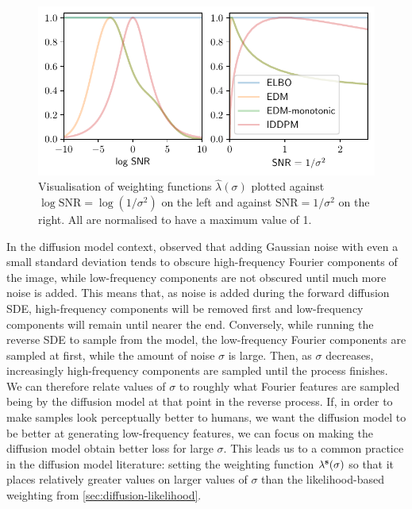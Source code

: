 \begin{figure}
    \centering
    \includegraphics[width=\textwidth]{figs/thesis/diffusion_weighting.pdf}
    \caption{Visualisation of weighting functions $\hat{\lambda}(\sigma)$ plotted against $\log \text{SNR} = \log(1/\sigma^2)$ on the left and against $\text{SNR} = 1/\sigma^2$ on the right. All are normalised to have a maximum value of 1.}
    \label{fig:diffusion-weighting}
\end{figure}

In the diffusion model context, \citet{yang2023diffusion} observed that adding Gaussian noise with even a small standard deviation tends to obscure high-frequency Fourier components of the image, while low-frequency components are not obscured until much more noise is added. This means that, as noise is added during the forward diffusion SDE, high-frequency components will be removed first and low-frequency components will remain until nearer the end. Conversely, while running the reverse SDE to sample from the model, the low-frequency Fourier components are sampled at first, while the amount of noise $\sigma$ is large. Then, as $\sigma$ decreases, increasingly high-frequency components are sampled until the process finishes. We can therefore relate values of $\sigma$ to roughly what Fourier features are sampled being by the diffusion model at that point in the reverse process. If, in order to make samples look perceptually better to humans, we want the diffusion model to be better at generating low-frequency features, we can focus on making the diffusion model obtain better loss for large $\sigma$. This leads us to a common practice in the diffusion model literature: setting the weighting function $\lambda^{\mathbf{s}}(\sigma)$ so that it places relatively greater values on larger values of $\sigma$ than the likelihood-based weighting from \cref{sec:diffusion-likelihood}.

